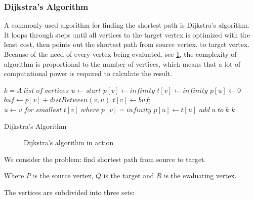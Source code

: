 
  \subsubsection{Dijkstra's Algorithm}


  A commonly used algorithm for finding the shortest path is Dijkstra's algorithm. It loops through steps until all vertices to the target vertex is optimized with the least cost, then points out the shortest path from source vertex, to target vertex. Because of the need of every vertex being evaluated, see \cref{fig:dijkstra}, the complexity of algorithm is proportional to the number of vertices, which means that a lot of computational power is required to calculate the result. \cite{Dijkstr1959}

  \begin{algorithm} \label{algo:Dij}
   $k = A \; list \; of \; vertices$\;
   $u \gets start$\;
  {
    $p[v] \gets infinity$\;
    $t[v] \gets infinity$\;
  }
  $p[u] \gets 0$\;
  {
    {
      $buf \gets p[v] + distBetween(v, u)$\;
      {
        $t[v] \gets buf$;
      }
    } 
    $u \gets v \; for \; smallest \; t[v] \; where \; p[v] = infinity$\;
    $p[u] \gets t[u]$\;
    $add \; u \; to \; k$\;
  }
  \Return $k$\;
 \caption{Dijkstra's Algorithm}
\end{algorithm}


  \begin{figure}[ht!]
    \centering
    \caption{Dijkstra's algorithm in action}
    \label{fig:dijkstra}
  \end{figure}

  We consider the problem: find shortest path from source to target.

  Where $P$ is the source vertex, $Q$ is the target and $R$ is the evaluating vertex.

  The vertices are subdivided into three sets:

